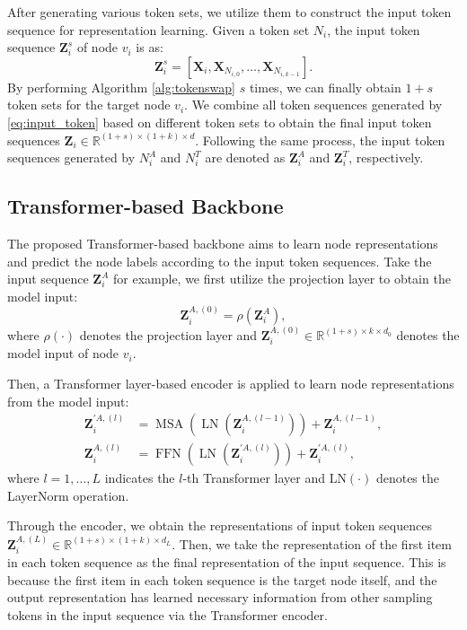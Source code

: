 After generating various token sets, we utilize them to construct the input token sequence for representation learning.
Given a token set $N_i$, the input token sequence $\mathbf{Z}_i^s$ of node $v_i$ is as:
\begin{equation}
    \mathbf{Z}_i^s = [\mathbf{X}_i, \mathbf{X}_{N_{i,0}}, \dots, \mathbf{X}_{N_{i,k-1}}].
    \label{eq:input_token}
\end{equation}
By performing Algorithm \ref{alg:tokenswap} $s$ times, we can finally obtain $1+s$ token sets for the target node $v_i$.
We combine all token sequences generated by \autoref{eq:input_token} based on different token sets to obtain the final input token sequences $\mathbf{Z}_i\in \mathbb{R}^{(1+s)\times (1+k) \times d}$.
Following the same process, the input token sequences generated by $N^{A}_i$ and $N^{T}_i$ are denoted as $\mathbf{Z}^A_i$ and $\mathbf{Z}^T_i$, respectively.


\subsection{Transformer-based Backbone}
The proposed Transformer-based backbone aims to learn node representations and predict the node labels according to the input token sequences.
Take the input sequence $\mathbf{Z}^A_i$ for example, we first utilize the projection layer to obtain the model input:
\begin{equation}
    \mathbf{Z}^{A,(0)}_i = \rho(\mathbf{Z}^A_i),
    \label{eq:projection}
\end{equation}
where $\rho(\cdot)$ denotes the projection layer and $\mathbf{Z}^{A,(0)}_i \in \mathbb{R}^{(1+s)\times k \times d_0}$ denotes the model input of node $v_i$.

Then, a Transformer layer-based encoder is applied to learn node representations from the model input:
\begin{align}
\mathbf{Z}^{\prime A,(l)}_{i} &=\operatorname{MSA}\left(\operatorname{LN}\left(\mathbf{Z}^{A,(l-1)}_{i}\right)\right)+\mathbf{Z}^{A, (l-1)}_{i}, \\
\mathbf{Z}^{A,(l)}_{i} &=\operatorname{FFN}\left(\operatorname{LN}\left(\mathbf{Z}^{\prime A,(l)}_{i}\right)\right)+\mathbf{Z}^{\prime A,(l)}_{i}, 
\end{align}
where $l=1, \ldots, L$ indicates the $l$-th Transformer layer and $\mathrm{LN}(\cdot)$ denotes the LayerNorm operation.

Through the encoder, we obtain the representations of input token sequences $\mathbf{Z}^{A,(L)}_i \in \mathbb{R}^{(1+s)\times (1+k) \times d_L}$. 
Then, we take the representation of the first item in each token sequence as the final representation of the input sequence.
This is because the first item in each token sequence is the target node itself, and the output representation has learned necessary information from other sampling tokens in the input sequence via the Transformer encoder.

